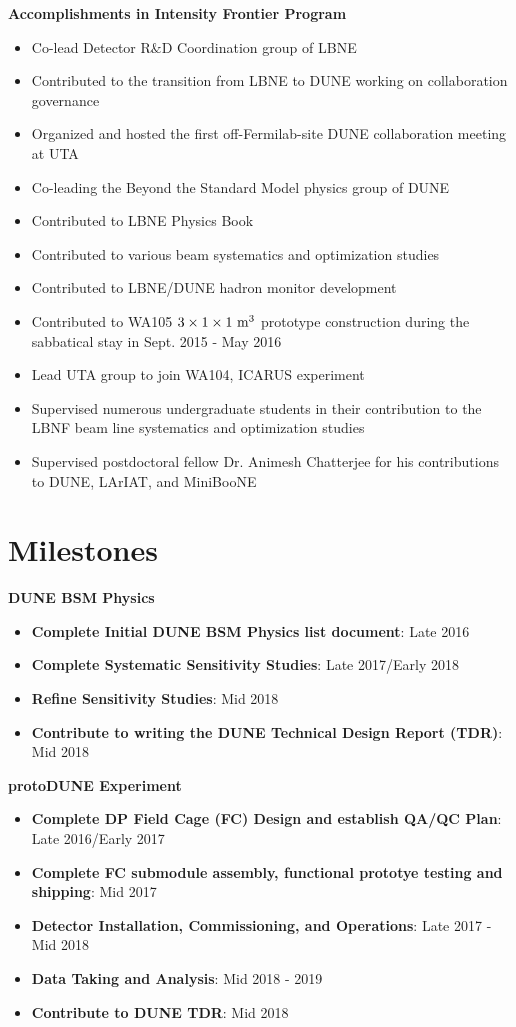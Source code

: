 \noindent\textbf{Accomplishments in Intensity Frontier Program}
\begin{itemize}[noitemsep,nolistsep]
\item{Co-lead Detector R$\&$D Coordination group of LBNE}
\item{Contributed to the transition from LBNE to DUNE working on collaboration governance}
\item{Organized and hosted the first off-Fermilab-site DUNE collaboration meeting at UTA}
\item{Co-leading the Beyond the Standard Model physics group of DUNE}
\item{Contributed to LBNE Physics Book}
\item{Contributed to various beam systematics and optimization studies}
\item{Contributed to LBNE/DUNE hadron monitor development}
\item{Contributed to WA105 $3\times 1 \times 1~{\rm m^{3}}$ prototype construction during the sabbatical stay in Sept. 2015 - May 2016}
\item{Lead UTA group to join WA104, ICARUS experiment}
\item {Supervised numerous undergraduate students in their contribution to the LBNF beam line systematics and optimization studies}
\item {Supervised postdoctoral fellow Dr. Animesh Chatterjee for his contributions to DUNE, LArIAT, and MiniBooNE}
\end{itemize}

\section*{\textbf{Milestones}}
\noindent\textbf{DUNE BSM Physics}
\begin{itemize}[noitemsep,nolistsep]
\item{\textbf{Complete Initial DUNE BSM Physics list document}}: Late 2016
\item{\textbf{Complete Systematic Sensitivity Studies}}: Late 2017/Early 2018
\item{\textbf{Refine Sensitivity Studies}}: Mid 2018
\item{\textbf{Contribute to writing the DUNE Technical Design Report (TDR)}}: Mid 2018
\end{itemize}

\noindent\textbf{protoDUNE Experiment}
\begin{itemize}[noitemsep,nolistsep]
\item{\textbf{Complete DP Field Cage (FC) Design and establish QA/QC Plan}}: Late 2016/Early 2017
\item{\textbf{Complete FC submodule assembly, functional prototye testing and shipping}}: Mid 2017
\item{\textbf{Detector Installation, Commissioning, and Operations}}: Late 2017 - Mid 2018
\item{\textbf{Data Taking and Analysis}}: Mid 2018 - 2019
\item{\textbf{Contribute to DUNE TDR}}: Mid 2018
\end{itemize}

